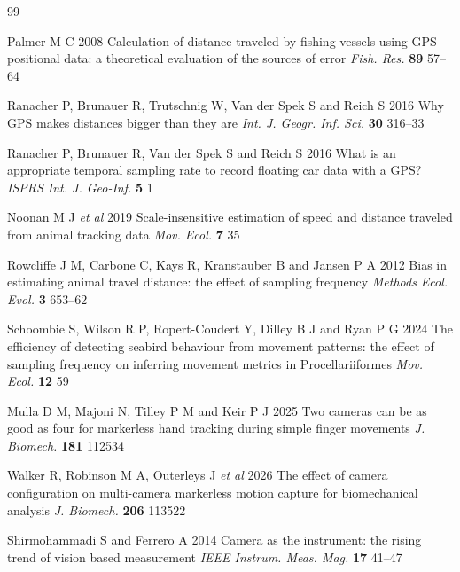\documentclass{iopjournal}
\begin{document}
\begin{thebibliography}{99}

 Palmer M C 2008 Calculation of distance traveled by fishing vessels
using GPS positional data: a theoretical evaluation of the sources of error
\textit{Fish. Res.} \textbf{89} 57--64

 Ranacher P, Brunauer R, Trutschnig W, Van der Spek S and Reich S
2016 Why GPS makes distances bigger than they are
\textit{Int. J. Geogr. Inf. Sci.} \textbf{30} 316--33

 Ranacher P, Brunauer R, Van der Spek S and Reich S 2016 What is an
appropriate temporal sampling rate to record floating car data with a GPS?
\textit{ISPRS Int. J. Geo-Inf.} \textbf{5} 1

 Noonan M J \textit{et al} 2019 Scale-insensitive estimation of
speed and distance traveled from animal tracking data
\textit{Mov. Ecol.} \textbf{7} 35

 Rowcliffe J M, Carbone C, Kays R, Kranstauber B and Jansen P A 2012
Bias in estimating animal travel distance: the effect of sampling frequency
\textit{Methods Ecol. Evol.} \textbf{3} 653--62

 Schoombie S, Wilson R P, Ropert-Coudert Y, Dilley B J and Ryan P G
2024 The efficiency of detecting seabird behaviour from movement patterns: the
effect of sampling frequency on inferring movement metrics in
Procellariiformes \textit{Mov. Ecol.} \textbf{12} 59

 Mulla D M, Majoni N, Tilley P M and Keir P J 2025 Two cameras can
be as good as four for markerless hand tracking during simple finger movements
\textit{J. Biomech.} \textbf{181} 112534

 Walker R, Robinson M A, Outerleys J \textit{et al} 2026 The effect
of camera configuration on multi-camera markerless motion capture for
biomechanical analysis \textit{J. Biomech.} \textbf{206} 113522

 Shirmohammadi S and Ferrero A 2014 Camera as the instrument: the
rising trend of vision based measurement
\textit{IEEE Instrum. Meas. Mag.} \textbf{17} 41--47


\end{thebibliography}
\end{document}
